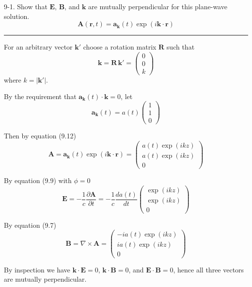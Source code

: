 \documentclass[12pt]{article}
\begin{document}
9-1.
Show that $\mathbf E$, $\mathbf B$, and $\mathbf k$ are
mutually perpendicular for this plane-wave solution.
\begin{equation*}
\mathbf A(\mathbf r,t)=\mathbf a_{\mathbf k}(t)
\exp(i\mathbf k\cdot\mathbf r)
\tag{9.12}
\end{equation*}

\bigskip
\hrule

\bigskip
For an arbitrary vector $\mathbf k'$
choose a rotation matrix $\mathbf R$ such that
\begin{equation*}
\mathbf k=\mathbf R\,\mathbf k'=\begin{pmatrix}0\\0\\k\end{pmatrix}
\end{equation*}
where $k=|\mathbf k'|$.

\bigskip
By the requirement that $\mathbf a_{\mathbf k}(t)\cdot\mathbf k=0$, let
\begin{equation*}
\mathbf a_{\mathbf k}(t)=a(t)\begin{pmatrix}1\\1\\0\end{pmatrix}
\end{equation*}

Then by equation (9.12)
\begin{equation*}
\mathbf A=\mathbf a_{\mathbf k}(t)\exp(i\mathbf k\cdot\mathbf r)
=\begin{pmatrix}
a(t)\exp(ikz)
\\[1ex]
a(t)\exp(ikz)
\\[1ex]
0
\end{pmatrix}
\end{equation*}

By equation (9.9) with $\phi=0$
\begin{equation*}
\mathbf E=-\frac{1}{c}\frac{\partial\mathbf A}{\partial t}=
-\frac{1}{c}\frac{da(t)}{dt}
\begin{pmatrix}
\exp(ikz)
\\[1ex]
\exp(ikz)
\\[1ex]
0
\end{pmatrix}
\end{equation*}

By equation (9.7)
\begin{equation*}
\mathbf B=\nabla\times\mathbf A=
\begin{pmatrix}
-ia(t)\exp(ikz)
\\[1ex]
ia(t)\exp(ikz)
\\[1ex]
0
\end{pmatrix}
\end{equation*}

By inspection we have $\mathbf k\cdot\mathbf E=0$, $\mathbf k\cdot\mathbf B=0$,
and $\mathbf E\cdot\mathbf B=0$, hence all three vectors are mutually perpendicular.
\end{document}
